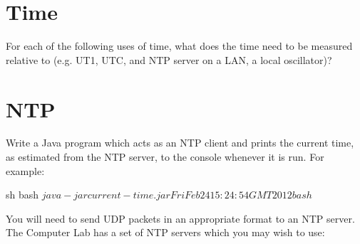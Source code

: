 \documentclass{supervision}
\begin{document}
\begin{questions}

    \section*{Time}
    \question For each of the following uses of time, what does the time need
      to be measured relative to (e.g. UT1, UTC, and NTP server on a LAN, a
      local oscillator)?

    \section*{NTP}
    \question Write a Java program which acts as an NTP client and prints the
      current time, as estimated from the NTP server, to the console whenever
      it is run. For example:

      \begin{code}{sh}
        bash $ java -jar current-time.jar
        Fri Feb 24 15:24:54 GMT 2012
        bash $
      \end{code}

      You will need to send UDP packets in an appropriate format to an NTP
      server. The Computer Lab has a set of NTP servers which you may wish to
      use:


\end{questions}
\end{document}
